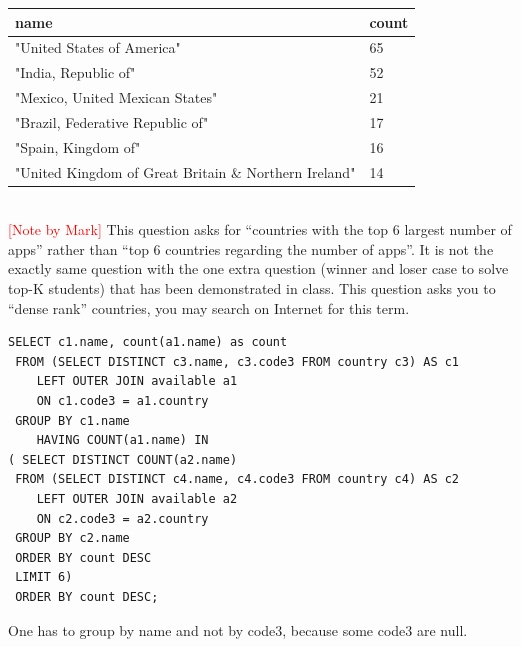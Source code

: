 \documentclass[10pt,a4paper,answers]{exam}
\begin{document}
\begin{questions}
\begin{parts}
\vspace{0.2cm}
\begin{center}
\begin{tabular}{|l|l|}
\hline
\hline
name & count \\ \hline
\hline
"United States of America"	&65\\ \hline
"India, Republic of"	&52\\ \hline
"Mexico, United Mexican States"	&21\\ \hline
"Brazil, Federative Republic of"&	17\\ \hline
"Spain, Kingdom of"	&16\\ \hline
"United Kingdom of Great Britain \& Northern Ireland"	& 14\\ \hline
\hline
\end{tabular}
\end{center}
\vspace{0.2cm}

\begin{solution}
\\
\textcolor{red}{[Note by Mark]} This question asks for ``countries with the top 6 largest number of apps'' rather than ``top 6 countries regarding the number of apps''. It is not the exactly same question with the one extra question (winner and loser case to solve top-K students) that has been demonstrated in class. This question asks you to ``dense rank'' countries, you may search on Internet for this term.

\begin{lstlisting}
SELECT c1.name, count(a1.name) as count
 FROM (SELECT DISTINCT c3.name, c3.code3 FROM country c3) AS c1 
    LEFT OUTER JOIN available a1 
    ON c1.code3 = a1.country
 GROUP BY c1.name
 	HAVING COUNT(a1.name) IN
( SELECT DISTINCT COUNT(a2.name) 
 FROM (SELECT DISTINCT c4.name, c4.code3 FROM country c4) AS c2 
    LEFT OUTER JOIN available a2 
    ON c2.code3 = a2.country
 GROUP BY c2.name
 ORDER BY count DESC
 LIMIT 6)
 ORDER BY count DESC;
\end{lstlisting}

One has to group by name and not by code3, because some code3 are null.


\end{solution}
\end{parts}
\end{questions}
\end{document}
